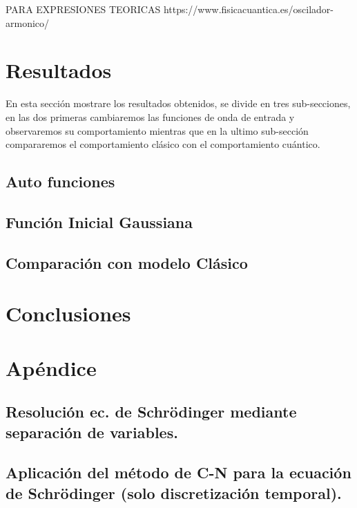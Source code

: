 \documentclass[10pt,onecolumn]{article}
\begin{document}
PARA EXPRESIONES TEORICAS https://www.fisicacuantica.es/oscilador-armonico/

\section{Resultados}
En esta sección mostrare los resultados obtenidos, se divide en tres sub-secciones, en las dos primeras cambiaremos las funciones de onda de entrada y observaremos su comportamiento mientras que en la ultimo sub-sección compararemos el comportamiento clásico con el comportamiento cuántico.

\subsection{Auto funciones}








\subsection{Función Inicial Gaussiana}


\subsection{Comparación con modelo Clásico}

\section{Conclusiones}


\section{Apéndice}
\subsection{Resolución ec. de Schrödinger mediante separación de variables.}


\subsection{Aplicación del método de C-N para la ecuación de Schrödinger (solo discretización temporal).}
\end{document}
